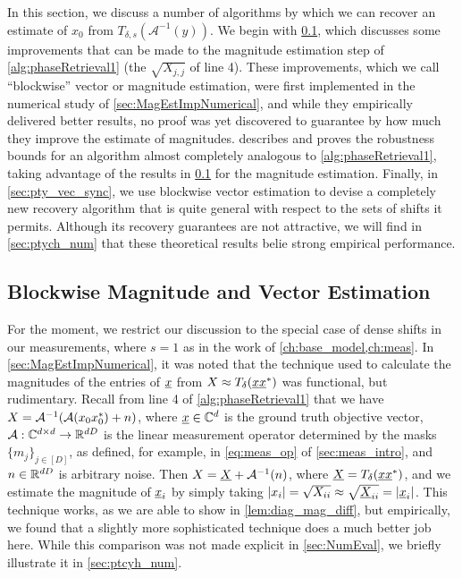In this section, we discuss a number of algorithms by which we can recover an estimate of $x_0$ from $T_{\delta, s}(\mathcal{A}^{-1}(y))$.  We begin with \cref{sec:blocky_block}, which discusses some improvements that can be made to the magnitude estimation step of \cref{alg:phaseRetrieval1} (the $\sqrt{X_{j,j}}$ of line 4).  These improvements, which we call ``blockwise'' vector or magnitude estimation, were first implemented in the numerical study of \cref{sec:MagEstImpNumerical}, and while they empirically delivered better results, no proof was yet discovered to guarantee by how much they improve the estimate of magnitudes.   describes and proves the robustness bounds for an algorithm almost completely analogous to \cref{alg:phaseRetrieval1}, taking advantage of the results in \cref{sec:blocky_block} for the magnitude estimation.  Finally, in \cref{sec:pty_vec_sync}, we use blockwise vector estimation to devise a completely new recovery algorithm that is quite general with respect to the sets of shifts it permits.  Although its recovery guarantees are not attractive, we will find in \cref{sec:ptych_num} that these theoretical results belie strong empirical performance.

\subsection{Blockwise Magnitude and Vector Estimation}
\label{sec:blocky_block}
For the moment, we restrict our discussion to the special case of dense shifts in our measurements, where $s = 1$ as in the work of \cref{ch:base_model,ch:meas}.  In \cref{sec:MagEstImpNumerical}, it was noted that the technique used to calculate the magnitudes of the entries of $\underline{x}$ from $X \approx T_\delta(\underline{x} \underline{x}^*)$ was functional, but rudimentary.  Recall from line 4 of \cref{alg:phaseRetrieval1} that we have $X = \mathcal{A}^{-1}(\mathcal{A}(x_0 x_0^*) + n)$, where $\underline{x} \in \mathbb{C}^d$ is the ground truth objective vector, $\mathcal{A} : \mathbb{C}^{d \times d} \to \mathbb{R}^{d D}$ is the linear measurement operator determined by the masks $\{m_j\}_{j \in [D]}$, as defined, for example, in \eqref{eq:meas_op} of \cref{sec:meas_intro}, and $n \in \mathbb{R}^{d D}$ is arbitrary noise.  Then $X = \underline{X} + \mathcal{A}^{-1}(n)$, where $\underline{X} = T_\delta(\underline{x} \underline{x}^*)$, and we estimate the magnitude of $\underline{x}_i$ by simply taking $\lvert x_i\rvert = \sqrt{X_{ii}} \approx \sqrt{\underline{X}_{ii}} = \lvert\underline{x}_i\rvert$.  This technique works, as we are able to show in \cref{lem:diag_mag_diff}, but empirically, we found that a slightly more sophisticated technique does a much better job here.  While this comparison was not made explicit in \cref{sec:NumEval}, we briefly illustrate it in \cref{sec:ptcyh_num}.

